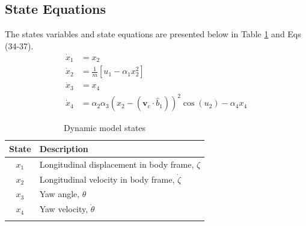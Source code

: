 \documentclass[conference]{IEEEtran}
\begin{document}
\subsection{State Equations}\label{sec:states}
The states variables and state equations are presented below in Table \ref{table:states} and Eqs (34-37). 
\begin{align}
\dot{x}_1   &= x_2 \\
\dot{x}_2   &= \frac{1}{m}[u_1 - \alpha_1 x_2^2] \\
\dot{x}_3   &= x_4 \\
\dot{x}_4   %
      &= \alpha_2 \alpha_3 (x_2 - (\bm{v}_{c} \cdot \hat{b}_1))^2 \cos(u_2) - \alpha_4 x_4
\end{align}

\begin{table}[h!]\label{table:states}
\normalsize
\centering
\begin{tabular}{c l}
\rowcolor{gray!20}
State & Description \\
\hline
$x_1$  & Longitudinal displacement in body frame, $\zeta$ \\
$x_2$  & Longitudinal velocity in body frame, $\dot{\zeta}$\\
$x_3$  & Yaw angle, $\theta$ \\ 
$x_4$  & Yaw velocity, $\dot{\theta}$ \\
\hline
\\
\end{tabular}
\caption{Dynamic model states}\label{table:states}
\end{table}
\end{document}

